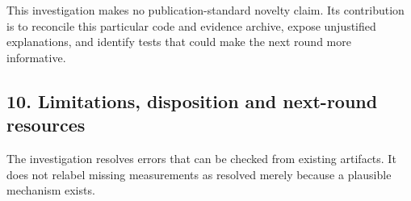 \documentclass[
  british,
  10pt,
  a4paper,
]{article}
\begin{document}
This investigation makes no publication-\allowbreak{}standard novelty
claim. Its contribution is to reconcile this particular code and
evidence archive, expose unjustified
explanations\allowbreak{},\allowbreak{} and identify tests that could
make the next round more informative.\allowbreak{}

\subsection{\texorpdfstring{10. Limitations,\allowbreak{} disposition
and next-round
resources}{10.  disposition and next-round resources}}\label{synthesis--limitations-disposition-and-next-round-resources}

The investigation resolves errors that can be checked from existing
artifacts. It does not relabel missing measurements as resolved merely
because a plausible mechanism exists.
\end{document}
